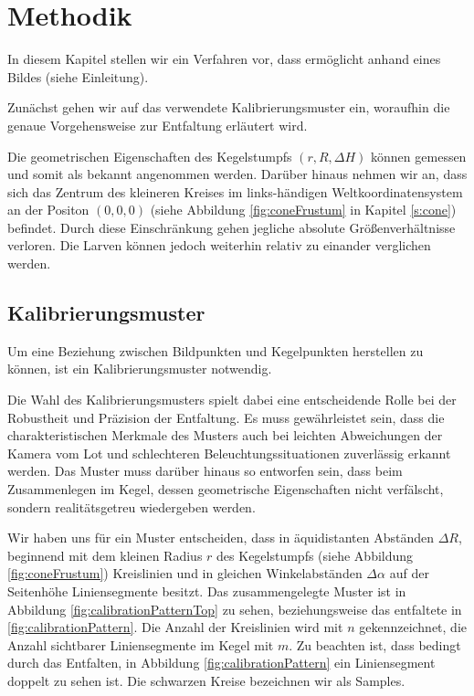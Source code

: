 \chapter{Methodik}
\label{ch:method}
In diesem Kapitel stellen wir ein Verfahren vor, dass ermöglicht anhand eines Bildes (siehe Einleitung).

Zunächst gehen wir auf das verwendete Kalibrierungsmuster ein, woraufhin die genaue Vorgehensweise zur Entfaltung erläutert wird. 

Die geometrischen Eigenschaften des Kegelstumpfs $(r, R, \Delta H)$ können gemessen und somit als bekannt angenommen werden. 
Darüber hinaus nehmen wir an, dass sich das Zentrum des kleineren Kreises im links-händigen Weltkoordinatensystem an der Positon $(0,0,0)$ (siehe Abbildung \ref{fig:coneFrustum} in Kapitel \ref{s:cone}) befindet. Durch diese Einschränkung gehen jegliche absolute Größenverhältnisse verloren. Die Larven können jedoch weiterhin relativ zu einander verglichen werden. 


\section{Kalibrierungsmuster}
\label{s:calibrationPattern}
Um eine Beziehung zwischen Bildpunkten und Kegelpunkten herstellen zu können, ist ein Kalibrierungsmuster notwendig.

Die Wahl des Kalibrierungsmusters spielt dabei eine entscheidende Rolle bei der Robustheit und Präzision der Entfaltung. Es muss gewährleistet sein, dass die charakteristischen Merkmale des Musters auch bei leichten Abweichungen der Kamera vom Lot und schlechteren Beleuchtungssituationen zuverlässig erkannt werden. Das Muster muss darüber hinaus so entworfen sein, dass beim Zusammenlegen im Kegel, dessen geometrische Eigenschaften nicht verfälscht, sondern realitätsgetreu wiedergeben werden. 

Wir haben uns für ein Muster entscheiden, dass in äquidistanten Abständen $\Delta R$, beginnend mit dem kleinen Radius $r$ des Kegelstumpfs (siehe Abbildung \ref{fig:coneFrustum}) Kreislinien und in gleichen Winkelabständen $\Delta \alpha$ auf der Seitenhöhe Liniensegmente besitzt. Das zusammengelegte Muster ist in Abbildung \ref{fig:calibrationPatternTop} zu sehen, beziehungsweise das entfaltete in \ref{fig:calibrationPattern}. Die Anzahl der Kreislinien wird mit $n$ gekennzeichnet, die Anzahl sichtbarer Liniensegmente im Kegel mit $m$. Zu beachten ist, dass bedingt durch das Entfalten, in Abbildung \ref{fig:calibrationPattern}  ein Liniensegment doppelt zu sehen ist. Die schwarzen Kreise bezeichnen wir als Samples. 

